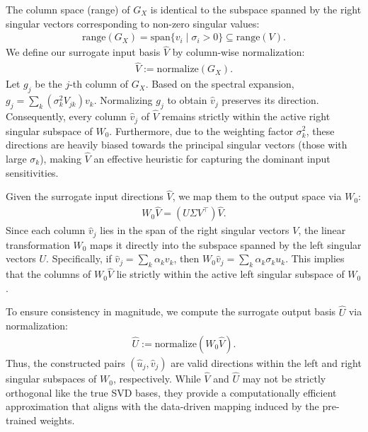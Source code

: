 \documentclass{article}
\theoremstyle{plain}
\theoremstyle{definition}
\theoremstyle{remark}
\begin{document}
The column space (range) of $G_X$ is identical to the subspace spanned by the right singular vectors corresponding to non-zero singular values:
\begin{align}
\mathrm{range}(G_X) = \mathrm{span}\{v_i \mid \sigma_i > 0\} \subseteq \mathrm{range}(V).
\end{align}
We define our surrogate input basis $\hat{V}$ by column-wise normalization:
\begin{align}
\hat{V} := \mathrm{normalize}(G_X).
\end{align}
Let $g_j$ be the $j$-th column of $G_X$. Based on the spectral expansion, $g_j = \sum_{k} (\sigma_k^2 V_{jk}) v_k$. Normalizing $g_j$ to obtain $\hat{v}_j$ preserves its direction. Consequently, every column $\hat{v}_j$ of $\hat{V}$ remains strictly within the active right singular subspace of $W_0$. Furthermore, due to the weighting factor $\sigma_k^2$, these directions are heavily biased towards the principal singular vectors (those with large $\sigma_k$), making $\hat{V}$ an effective heuristic for capturing the dominant input sensitivities.

Given the surrogate input directions $\hat{V}$, we map them to the output space via $W_0$:
\begin{align}
W_0 \hat{V} = (U \Sigma V^\top) \hat{V}.
\end{align}
Since each column $\hat{v}_j$ lies in the span of the right singular vectors $V$, the linear transformation $W_0$ maps it directly into the subspace spanned by the left singular vectors $U$. Specifically, if $\hat{v}_j = \sum_k \alpha_k v_k$, then $W_0 \hat{v}_j = \sum_k \alpha_k \sigma_k u_k$.
This implies that the columns of $W_0 \hat{V}$ lie strictly within the active left singular subspace of $W_0$.

To ensure consistency in magnitude, we compute the surrogate output basis $\hat{U}$ via normalization:
\begin{align}
\hat{U} := \mathrm{normalize}(W_0 \hat{V}).
\end{align}
Thus, the constructed pairs $(\hat{u}_j, \hat{v}_j)$ are valid directions within the left and right singular subspaces of $W_0$, respectively. While $\hat{V}$ and $\hat{U}$ may not be strictly orthogonal like the true SVD bases, they provide a computationally efficient approximation that aligns with the data-driven mapping induced by the pre-trained weights.
\end{document}
